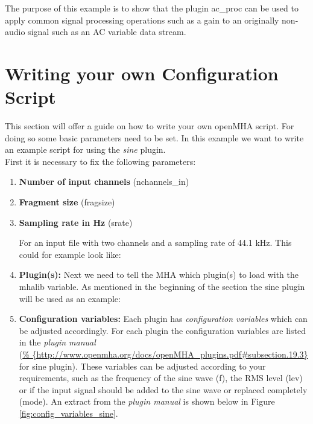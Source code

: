 \documentclass[11pt,a4paper,twoside]{article}
\newcommand{\+}{\discretionary{\mbox{\scriptsize$\hookleftarrow$}}{}{}}
\begin{document}
{{\begin{enumerate}
The purpose of this example is to show that the plugin ac\_proc can be used to apply common signal processing operations such as a gain to an originally non-audio signal such as an AC variable data stream.
\end{enumerate}







\newpage

\section{Writing your own Configuration Script}
\label{sec:own_config_script}

This section will offer a guide on how to write your own openMHA script. For doing so some basic parameters need to be set. In this example we want to write an example script for using the \textit {sine} plugin. \\



First it is necessary to fix the following parameters:

\begin{enumerate}
\item \textbf{Number of input channels} ({\ttfamily nchannels\_in})
\item \textbf{Fragment size} ({\ttfamily fragsize})
\item \textbf{Sampling rate in Hz} ({\ttfamily srate}) 

For an input file with two channels and a sampling rate of 44.1 kHz. This could for example look like: \\





\item \textbf{Plugin(s):} Next we need to tell the MHA which plugin(s) to load with the {\ttfamily mhalib} variable. As mentioned in the beginning of the section the sine plugin will be used as an example: \\



\item \textbf{Configuration variables:} Each plugin has \textit{configuration variables} which can be adjusted accordingly. For each plugin the configuration variables are listed in the \textit{plugin manual} 
\\(\footnotesize{\url{%
          {http://www.openmha.org/docs/openMHA_plugins.pdf#subsection.19.3}}}
\normalsize for sine plugin). These variables can be adjusted according to your requirements, such as the frequency of the sine wave ({\ttfamily f}), the RMS level ({\ttfamily lev}) or if the input signal should be added to the sine wave or replaced completely ({\ttfamily mode}). An extract from the \textit{plugin manual} is shown below in Figure \ref{fig:config_variables_sine}. 


\end{enumerate}}}
\end{document}
